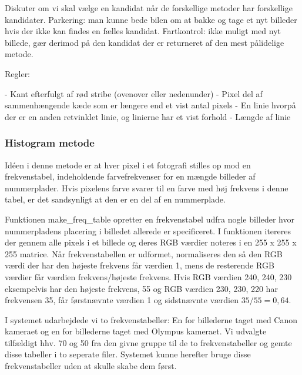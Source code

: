 Diskuter om vi skal vælge en kandidat når de forskellige metoder har forskellige kandidater. Parkering: man kunne bede bilen om at bakke og tage et nyt billeder hvis der ikke kan findes en fælles kandidat. Fartkontrol: ikke muligt med nyt billede, gær derimod på den kandidat der er returneret af den mest pålidelige metode. 

Regler:

- Kant efterfulgt af rød stribe (ovenover eller nedenunder)
- Pixel del af sammenhængende kæde som er længere end et vist antal pixels
- En linie hvorpå der er en anden retvinklet linie, og linierne har et vist forhold
- Længde af linie


\subsubsection*{Histogram metode}
\label{histo}

Idéen i denne metode er at hver pixel i et fotografi stilles op mod en frekvenstabel, indeholdende farvefrekvenser for en mængde billeder af nummerplader. Hvis pixelens farve svarer til en farve med høj frekvens i denne tabel, er det sandsynligt at den er en del af en nummerplade.



Funktionen make\_freq\_table opretter en frekvenstabel udfra nogle billeder hvor nummerpladens placering i billedet allerede er specificeret. I funktionen itereres der gennem alle pixels i et billede og deres RGB værdier noteres i en 255 x 255 x 255 matrice. Når frekvenstabellen er udformet, normaliseres den så den RGB værdi der har den højeste frekvens får værdien 1, mens de resterende RGB værdier får værdien frekvens/højeste frekvens. Hvis RGB værdien 240, 240, 230 eksempelvis har den højeste frekvens, 55 og RGB værdien 230, 230, 220 har frekvensen 35, får førstnævnte værdien 1 og sidstnævnte værdien $35/55 = 0,64$.


I systemet udarbejdede vi to frekvenstabeller: En for billederne taget med Canon kameraet og en for billederne taget med Olympus kameraet. Vi udvalgte tilfældigt hhv. 70 og 50 fra den givne gruppe til de to frekvenstabeller og gemte disse tabeller i to seperate filer. Systemet kunne herefter bruge disse frekvenstabeller uden at skulle skabe dem først.

